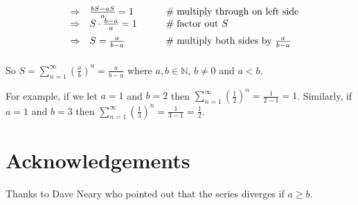 \documentclass[11pt, oneside]{article}   	%
\begin{document}
\begin{equation*}
\begin{array}{lllll}
&\Rightarrow& \frac{bS - aS}{a} = 1                                                                                                                            &\qquad  \mathrel{\#} \text{multiply through on left side}                 \\
\vspace{2.0mm}
&\Rightarrow& S \cdot \frac{b - a} {a} = 1                                                                                                                   &\qquad  \mathrel{\#} \text{factor out $S$}                                       \\
\vspace{2.0mm}
&\Rightarrow& S  = \frac{a}{b - a}                                                                                                                               &\qquad  \mathrel{\#} \text{multiply both sides by $ \frac{a}{b - a} $}
\end{array}
\end{equation*}

\bigskip
\noindent
So $S = \sum\limits_{n = 1}^\infty (\frac{a}{b})^n  =  \frac{a}{b -a}$ where $a,b \in \mathbb{N}$, $b \neq 0$ and $a < b$.  

\bigskip
\noindent
For example, if we  let $a =1$ and $b =2$ then $\sum\limits_{n = 1}^\infty (\frac{1}{2})^n  =  \frac{1}{2-1} = 1$. Similarly, if $a =1$ and $b = 3$ then 
$\sum\limits_{n = 1}^\infty (\frac{1}{3})^n  =  \frac{1}{3-1} = \frac{1}{2}$. 

\bigskip
\noindent
\section*{Acknowledgements}

Thanks to Dave Neary who pointed out that the series diverges if $a \geq b$.
\end{document}
